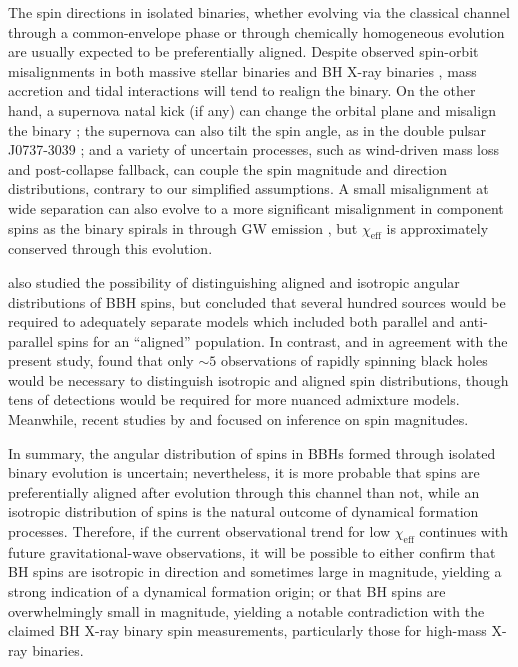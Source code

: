 \documentclass[modern,linenumbers]{aastex61}
\newcommand{\chieff}{\chi_\mathrm{eff}}
\begin{document}
The spin directions in isolated binaries, whether evolving via the
classical channel through a common-envelope phase
\citep{TutukovYungelson:1973,TutukovYungelson:1993,Lipunov:1997,2016Natur.534..512B,Stevenson:2017}
or through chemically homogeneous evolution
\citep{MandeldeMink:2016,Marchant:2016} are usually expected to be
preferentially aligned.  Despite observed spin-orbit misalignments in
both massive stellar binaries
\citep{Albrecht:2009,2014ApJ...785...83A} and BH X-ray binaries
\citep{Orosz:2001,Martin:2008b,Martin:2008,MorningstarMiller:2014},
mass accretion and tidal interactions will tend to realign the binary.
On the other hand, a supernova natal kick (if any) can change the
orbital plane and misalign the binary
\citep{2000ApJ...541..319K,2013PhRvD..87j4028G}; the supernova can
also tilt the spin angle, as in the double pulsar J0737-3039
\citep{2011ApJ...742...81F}; and a variety of uncertain processes,
such as wind-driven mass loss and post-collapse fallback, can couple
the spin magnitude and direction distributions, contrary to our
simplified assumptions.  A small misalignment at wide separation can
also evolve to a more significant misalignment in component spins as
the binary spirals in through \ac{GW} emission \citep{2015PhRvD..92f4016G},
but $\chieff$ is approximately conserved through this evolution.

\citet{2017CQGra..34cLT01V} also studied the possibility of
distinguishing aligned and isotropic angular distributions of \ac{BBH}
spins, but concluded that several hundred sources would be required to
adequately separate models which included both parallel and
anti-parallel spins for an ``aligned'' population.  In contrast, and
in agreement with the present study, \citet{Stevenson:2017spin} found
that only $\sim 5$ observations of rapidly spinning black holes would
be necessary to distinguish isotropic and aligned spin distributions,
though tens of detections would be required for more nuanced admixture
models.  Meanwhile, recent studies by
\citet{2017arXiv170306869F} and \citet{2017arXiv170306223G} focused on inference
on spin magnitudes.

In summary, the angular distribution of spins in \acp{BBH} formed
through isolated binary evolution is uncertain; nevertheless, it is
more probable that spins are preferentially aligned after evolution
through this channel than not, while an isotropic distribution of
spins is the natural outcome of dynamical formation processes.
Therefore, if the current observational trend for low $\chieff$
continues with future gravitational-wave observations, it will be
possible to either confirm that \ac{BH} spins are isotropic in
direction and sometimes large in magnitude, yielding a strong
indication of a dynamical formation origin; or that \ac{BH} spins are
overwhelmingly small in magnitude, yielding a notable contradiction
with the claimed \ac{BH} X-ray binary spin measurements, particularly
those for high-mass X-ray binaries.
\end{document}
